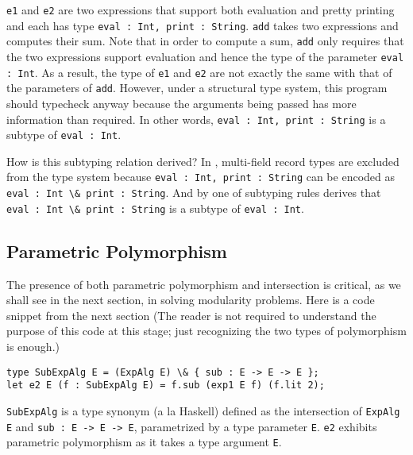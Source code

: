 

\lstinline{e1} and \lstinline{e2} are two expressions that support both evaluation and pretty
printing and each has type \lstinline{eval : Int, print : String}. \lstinline{add} takes
two expressions and computes their sum. Note that in order to compute a sum,
\lstinline{add} only requires that the two expressions support evaluation and hence the
type of the parameter \lstinline{eval : Int}. As a result, the type of \lstinline{e1} and
\lstinline{e2} are not exactly the same with that of the parameters of \lstinline{add}. However,
under a structural type system, this program should typecheck anyway because the
arguments being passed has more information than required. In other words,
\lstinline{eval : Int, print : String} is a subtype of \lstinline{eval : Int}.

How is this subtyping relation derived? In \systemFI, multi-field record types are
excluded from the type system because \lstinline{eval : Int, print : String} can
be encoded as \lstinline{eval : Int \& print : String}. And by one of
subtyping rules derives that \lstinline{eval : Int \& print : String} is a
subtype of \lstinline{eval : Int}.



\subsection{Parametric Polymorphism}

The presence of both parametric polymorphism and intersection is critical, as we
shall see in the next section, in solving modularity problems. Here is a code
snippet from the next section (The reader is not required to understand the
purpose of this code at this stage; just recognizing the two types of
polymorphism is enough.)
\begin{lstlisting}
type SubExpAlg E = (ExpAlg E) \& { sub : E -> E -> E };
let e2 E (f : SubExpAlg E) = f.sub (exp1 E f) (f.lit 2);
\end{lstlisting}
\lstinline{SubExpAlg} is a type synonym (a la Haskell) defined as the intersection of
\lstinline{ExpAlg E} and \lstinline{sub : E -> E -> E}, parametrized by a type parameter
\lstinline{E}. \lstinline{e2} exhibits parametric polymorphism as it takes a type argument
\lstinline{E}.
